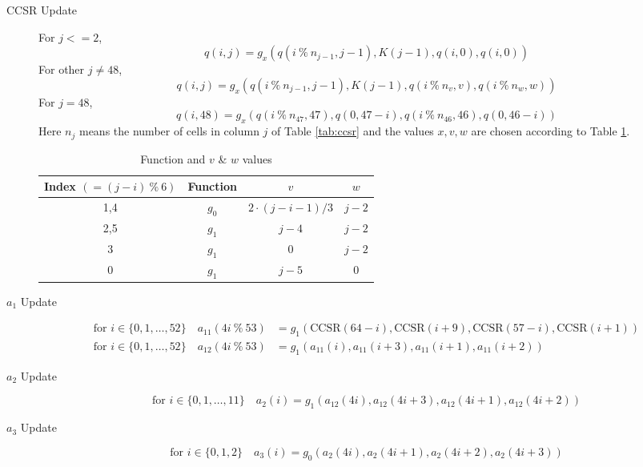 \documentclass[a4paper,10pt]{article}
\begin{document}
\begin{description}
    \item[CCSR Update]  For $j <= 2$,
    \begin{equation}
        q(i,j) = g_x(q(i \ \%\ n_{j-1}, j-1), K(j-1), q(i, 0), q(i, 0))
    \end{equation}
    For other $j \neq 48$,
    \begin{equation}
        q(i,j) = g_x(q(i \ \%\ n_{j-1}, j-1), K(j-1), q(i \ \%\ n_{v}, v), q(i \ \%\ n_{w}, w))
    \end{equation}
    For $j = 48$,
    \begin{equation}
        q(i,48) = g_x(q(i \ \%\ n_{47}, 47), q(0, 47 -i), q(i \ \%\ n_{46}, 46), q(0, 46 -i))
    \end{equation}
    Here $n_{j}$ means the number of cells in column $j$ of Table \ref{tab:ccsr} and the values $x, v, w$ are chosen according to Table \ref{tab:xvw}.

\begin{table}[h]
\centering
\begin{tabular}{cccc}
Index $(=(j-i)\ \% \ 6)$ & Function & $v$             & $w$     \\\hline
1,4   & $g_0$    & $2\cdot(j-i-1)/3$ & $j-2$ \\
2,5   & $g_1$    & $j-4$         & $j-2$ \\
3     & $g_1$    & 0             & $j-2$ \\
0     & $g_1$    & $j-5$         & 0    
\end{tabular}
\caption{Function and $v$ \& $w$ values}
\label{tab:xvw}
\end{table}
    \item[$a_{1}$ Update]
    \begin{equation}
        \begin{aligned}
            \text{for } i \in \{0,1,\ldots,52\} \quad a_{11}(4i \ \%\ 53) &= g_1(\text{CCSR}(64-i), \text{CCSR}(i+9), \text{CCSR}(57-i), \text{CCSR}(i+1))\\
            \text{for } i \in \{0,1,\ldots,52\} \quad a_{12}(4i \ \%\ 53) &= g_1(a_{11}(i), a_{11}(i+3), a_{11}(i+1), a_{11}(i+2))
        \end{aligned}
    \end{equation}
    \item[$a_{2}$ Update]
    \begin{equation}
            \text{for } i \in \{0,1,\ldots,11\} \quad a_{2}(i) = g_1(a_{12}(4i), a_{12}(4i+3), a_{12}(4i+1), a_{12}(4i+2))
    \end{equation}
    \item[$a_{3}$ Update]
    \begin{equation}
            \text{for } i \in \{0,1,2\} \quad a_{3}(i) = g_0(a_{2}(4i), a_{2}(4i+1), a_{2}(4i+2), a_{2}(4i+3))
    \end{equation}
\end{description}
\end{document}
